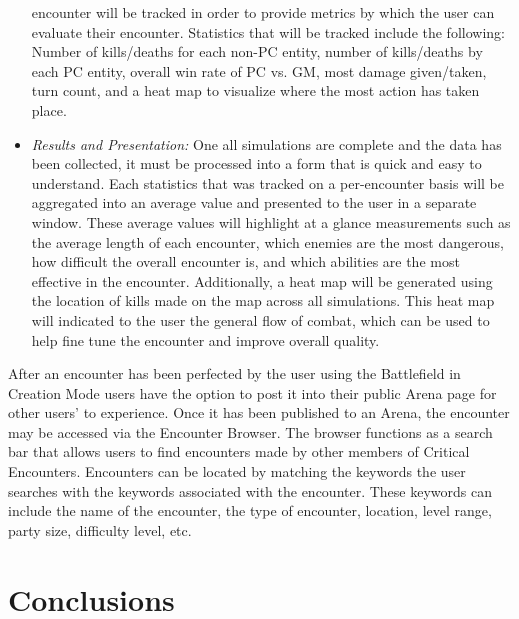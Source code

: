 \documentclass[letterpaper, 10 pt, conference]{ieeeconf}
\begin{document}
\begin{itemize}
	encounter will be tracked in order to provide metrics by which the user can evaluate
	their encounter. Statistics that will be tracked include the following: Number of kills/deaths for each non-PC entity, number of kills/deaths by each PC entity, overall win rate of PC vs. GM, most damage given/taken, turn count, and a heat map to visualize where the most action has taken place.
	\item \textit{Results and Presentation:} One all simulations are complete and the data has been collected, it must be
	processed into a form that is quick and easy to understand. Each statistics that
	was tracked on a per-encounter basis will be aggregated into an average value and
	presented to the user in a separate window. These average values will highlight
	at a glance measurements such as the average length of each encounter, which
	enemies are the most dangerous, how difficult the overall encounter is, and which
	abilities are the most effective in the encounter. Additionally, a heat map will be
	generated using the location of kills made on the map across all simulations. This
	heat map will indicated to the user the general flow of combat, which can be used
	to help fine tune the encounter and improve overall quality.
\end{itemize}
After an encounter has been perfected by the user using the Battlefield in
Creation Mode users have the option to post it into their public Arena page for
other users’ to experience. Once it has been published to an Arena, the encounter
may be accessed via the Encounter Browser. The browser functions as a search bar
that allows users to find encounters made by other members of Critical Encounters.
Encounters can be located by matching the keywords the user searches with the
keywords associated with the encounter. These keywords can include the name
of the encounter, the type of encounter, location, level range, party size, difficulty
level, etc.
\section{Conclusions}
\end{document}
